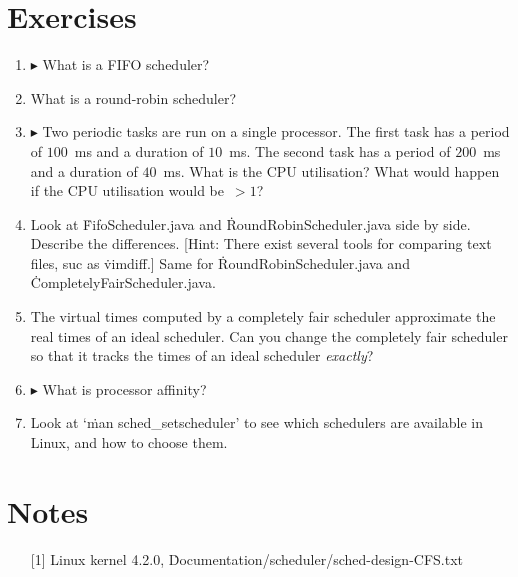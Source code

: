 \section{Exercises}

\begin{enumerate}
\item
  $\blacktriangleright$
  What is a FIFO scheduler?
\item
  What is a round-robin scheduler?
\item
  $\blacktriangleright$
  Two periodic tasks are run on a single processor.
  The first task has a period of $100$~ms and a duration of $10$~ms.
  The second task has a period of $200$~ms and a duration of $40$~ms.
  What is the CPU utilisation?
  What would happen if the CPU utilisation would be~$>1$?
\item
  Look at \.{FifoScheduler.java} and \.{RoundRobinScheduler.java} side by side.
  Describe the differences.
  [Hint: There exist several tools for comparing text files, suc as \.{vimdiff}.]
  Same for \.{RoundRobinScheduler.java} and \.{CompletelyFairScheduler.java}.
\item
  The virtual times computed by a completely fair scheduler
    approximate the real times of an ideal scheduler.
  Can you change the completely fair scheduler
    so that it tracks the times of an ideal scheduler \emph{exactly}?
\item
  $\blacktriangleright$
  What is processor affinity?
\item
  Look at `\.{man sched\_setscheduler}'
    to see which schedulers are available in Linux,
  and how to choose them.
\end{enumerate}

\section{Notes}

\begin{itemize}
\item[{[1]}]
  Linux kernel 4.2.0, \.{Documentation/scheduler/sched-design-CFS.txt}
\end{itemize}


